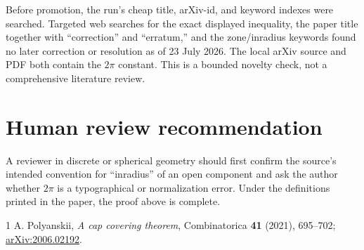 \documentclass[11pt]{article}
\begin{document}
Before promotion, the run's cheap title, arXiv-id, and keyword indexes were
searched.  Targeted web searches for the exact displayed inequality, the
paper title together with ``correction'' and ``erratum,'' and the
zone/inradius keywords found no later correction or resolution as of
23 July 2026.  The local arXiv source and PDF both contain the $2\pi$
constant.  This is a bounded novelty check, not a comprehensive literature
review.

\section{Human review recommendation}

A reviewer in discrete or spherical geometry should first confirm the
source's intended convention for ``inradius'' of an open component and ask
the author whether $2\pi$ is a typographical or normalization error.  Under
the definitions printed in the paper, the proof above is complete.

\begin{thebibliography}{1}
A. Polyanskii,
\emph{A cap covering theorem},
Combinatorica \textbf{41} (2021), 695--702;
\href{https://arxiv.org/abs/2006.02192}{arXiv:2006.02192}.
\end{thebibliography}
\end{document}

